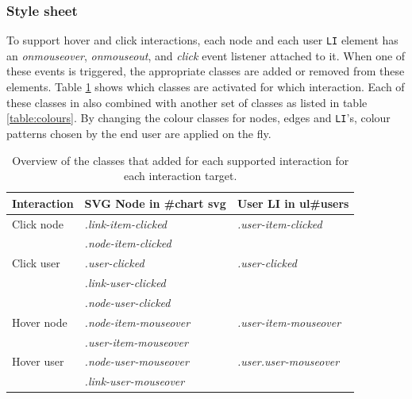 

\subsubsection{Style sheet}

To support hover and click interactions, each node and each user \texttt{LI} element has an \emph{onmouseover}, \emph{onmouseout}, and \emph{click} event listener attached to it. When one of these events is triggered, the appropriate classes are added or removed from these elements. Table \ref{table:interactions} shows which classes are activated for which interaction. Each of these classes in also combined with another set of classes as listed in table \ref{table:colours}. By changing the colour classes for nodes, edges and \texttt{LI}'s, colour patterns chosen by the end user are applied on the fly.


\begin{table}%
	\begin{center}
		\begin{tabular}{l | l l}
			\hline
			\textbf{Interaction}		& SVG Node in \textbf{\#chart svg} & User LI in \textbf{ul\#users }
			\\
			\hline
			Click node		& \textit{.link-item-clicked} & \textit{.user-item-clicked} \\
										& \textit{.node-item-clicked} & \\
			Click user		& \textit{.user-clicked} 			& \textit{.user-clicked} \\
										& \textit{.link-user-clicked} & \\
										& \textit{.node-user-clicked} & \\
			Hover node		& \textit{.node-item-mouseover} 	& \textit{.user-item-mouseover} \\
										& \textit{.user-item-mouseover}		& \\
			Hover user		& \textit{.node-user-mouseover} 	& \textit{.user.user-mouseover} \\
										& \textit{.link-user-mouseover}		& \\
			\hline
		\end{tabular}
	\end{center}
	\caption{Overview of the classes that added for each supported interaction for each interaction target.}
	\label{table:interactions}
\end{table}


